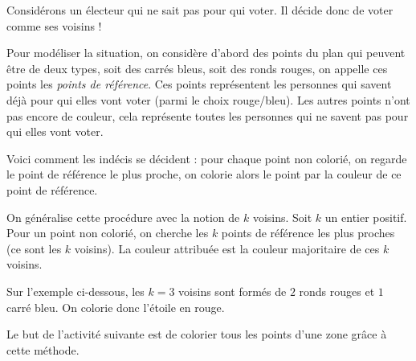 \documentclass[10pt,class=report,crop=false]{standalone}
\begin{document}




\bigskip



\begin{cours}

Considérons un électeur qui ne sait pas pour qui voter. 
Il décide donc de voter comme ses voisins !


Pour modéliser la situation, on considère d'abord des points du plan qui peuvent être de deux types, soit des carrés bleus, soit des ronds rouges, on appelle ces points les \emph{points de référence}.
Ces points représentent les personnes qui savent déjà pour qui elles vont voter (parmi le choix rouge/bleu).
Les autres points n'ont pas encore de couleur, cela représente toutes les personnes qui ne savent pas pour qui elles vont voter.

Voici comment les indécis se décident : 
pour chaque point non colorié, on regarde le point de référence le plus proche, on colorie alors le point par la couleur de ce point de référence.


On généralise cette procédure avec la notion de \og{}$k$ voisins\fg{}.
Soit $k$ un entier positif. Pour un point non colorié, on cherche
les $k$ points de référence les plus proches (ce sont les $k$ voisins). La couleur attribuée est la couleur majoritaire de ces $k$ voisins.

Sur l'exemple ci-dessous, les $k=3$ voisins sont formés de $2$ ronds rouges et $1$ carré bleu. On colorie donc l'étoile en rouge.

Le but de l'activité suivante est de colorier tous les points d'une zone grâce à cette méthode.
\end{cours}
\end{document}
